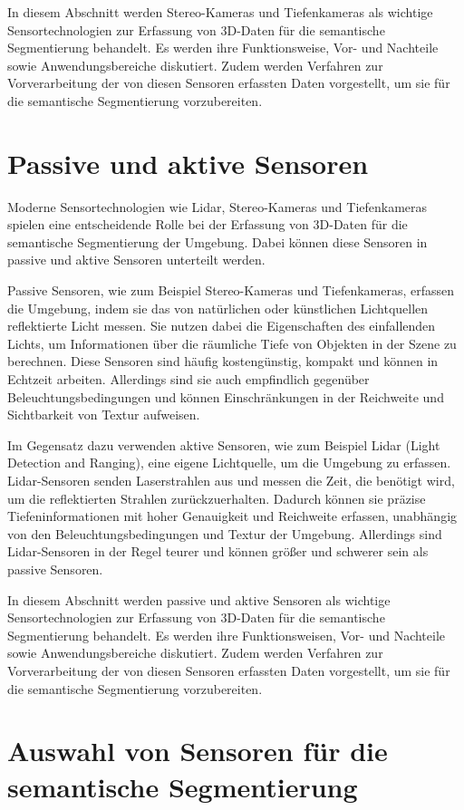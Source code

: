In diesem Abschnitt werden Stereo-Kameras und Tiefenkameras als wichtige
Sensortechnologien zur Erfassung von 3D-Daten für die semantische Segmentierung
behandelt. Es werden ihre Funktionsweise, Vor- und Nachteile sowie
Anwendungsbereiche diskutiert. Zudem werden Verfahren zur Vorverarbeitung der
von diesen Sensoren erfassten Daten vorgestellt, um sie für die semantische
Segmentierung vorzubereiten.

\section{Passive und aktive Sensoren}
Moderne Sensortechnologien wie Lidar, Stereo-Kameras und Tiefenkameras spielen
eine entscheidende Rolle bei der Erfassung von 3D-Daten für die semantische
Segmentierung der Umgebung. Dabei können diese Sensoren in passive und aktive
Sensoren unterteilt werden.

Passive Sensoren, wie zum Beispiel Stereo-Kameras und Tiefenkameras, erfassen
die Umgebung, indem sie das von natürlichen oder künstlichen Lichtquellen
reflektierte Licht messen. Sie nutzen dabei die Eigenschaften des einfallenden
Lichts, um Informationen über die räumliche Tiefe von Objekten in der Szene zu
berechnen. Diese Sensoren sind häufig kostengünstig, kompakt und können in
Echtzeit arbeiten. Allerdings sind sie auch empfindlich gegenüber
Beleuchtungsbedingungen und können Einschränkungen in der Reichweite und
Sichtbarkeit von Textur aufweisen.

Im Gegensatz dazu verwenden aktive Sensoren, wie zum Beispiel Lidar (Light
Detection and Ranging), eine eigene Lichtquelle, um die Umgebung zu erfassen.
Lidar-Sensoren senden Laserstrahlen aus und messen die Zeit, die benötigt wird,
um die reflektierten Strahlen zurückzuerhalten. Dadurch können sie präzise
Tiefeninformationen mit hoher Genauigkeit und Reichweite erfassen, unabhängig
von den Beleuchtungsbedingungen und Textur der Umgebung. Allerdings sind
Lidar-Sensoren in der Regel teurer und können größer und schwerer sein als
passive Sensoren.

In diesem Abschnitt werden passive und aktive Sensoren als wichtige
Sensortechnologien zur Erfassung von 3D-Daten für die semantische Segmentierung
behandelt. Es werden ihre Funktionsweisen, Vor- und Nachteile sowie
Anwendungsbereiche diskutiert. Zudem werden Verfahren zur Vorverarbeitung der
von diesen Sensoren erfassten Daten vorgestellt, um sie für die semantische
Segmentierung vorzubereiten.

\section{Auswahl von Sensoren für die semantische Segmentierung}

